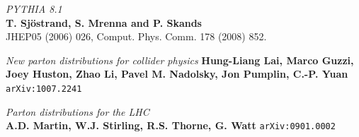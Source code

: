 \documentclass[11pt,a4paper,final]{report}
\begin{document}
\begin{thebibliography}{9}
	\textit{PYTHIA 8.1}\\
	\textbf{T. Sjöstrand, S. Mrenna and P. Skands}\\
	JHEP05 (2006) 026, Comput. Phys. Comm. 178 (2008) 852. 
	
	\textit{New parton distributions for collider physics}
	\textbf{Hung-Liang Lai, Marco Guzzi, Joey Huston, Zhao Li, Pavel M. Nadolsky, Jon Pumplin, C.-P. Yuan}
	\texttt{arXiv:1007.2241}
	
	\textit{Parton distributions for the LHC}\\
	\textbf{A.D. Martin, W.J. Stirling, R.S. Thorne, G. Watt}
	\texttt{arXiv:0901.0002}
	
\end{thebibliography}
\end{document}
